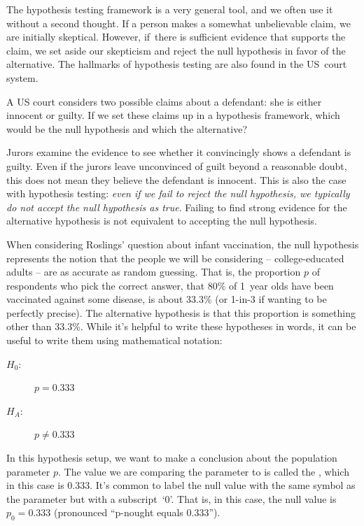The hypothesis testing framework is a very general tool, and we often use it without a second thought. If a person makes a somewhat unbelievable claim, we are initially skeptical. However, if~there is sufficient evidence that supports the claim, we set aside our skepticism and reject the null hypothesis in favor of the alternative. The hallmarks of hypothesis testing are also found in the US~court system. 

\begin{exercisewrap}
\begin{nexercise} \label{hypTestCourtExample}
A US court considers two possible claims about a defendant: she is either innocent or guilty. If we set these claims up in a hypothesis framework, which would be the null hypothesis and which the alternative?\footnotemark
\end{nexercise}
\end{exercisewrap}

Jurors examine the evidence to see whether it convincingly
shows a defendant is guilty.
Even if the jurors leave unconvinced of guilt beyond
a reasonable doubt, this does not mean they believe the
defendant is innocent.
This is also the case with hypothesis testing:
\emph{even if we fail to reject the null hypothesis,
we typically do not accept the null hypothesis as true}.
Failing to find strong evidence for the alternative
hypothesis is not equivalent to accepting
the null hypothesis.

When considering Roslings' question about infant vaccination,
the null hypothesis represents the notion that the people
we will be considering -- college-educated adults --
are as accurate as random guessing.
That is, the proportion
$p$ of respondents who pick the correct
answer, that 80\% of 1~year olds have been vaccinated
against some disease, is about 33.3\%
(or 1-in-3 if wanting to be perfectly precise).
The alternative hypothesis is that this proportion is something
other than 33.3\%. While it's helpful to write these hypotheses
in words, it can be useful to write them using mathematical
notation:
\begin{description}
\item[$H_0$:] $p = 0.333$
\item[$H_A$:] $p \neq 0.333$
\end{description}
In this hypothesis setup, we want to make a conclusion about
the population parameter $p$. The value we are comparing the
parameter to is called the , which in this
case is 0.333. It's common to label the null value with the
same symbol as the parameter but with a subscript~`0'.
That is, in this case, the null value is $p_0 = 0.333$
(pronounced ``p-nought equals 0.333'').

